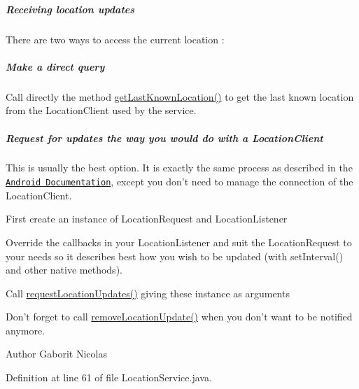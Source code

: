 \subparagraph*{Receiving location updates}

There are two ways to access the current location \-:

\subparagraph*{Make a direct query}

Call directly the method {\ttfamily \hyperlink{classcom_1_1qualoutdoor_1_1recorder_1_1location_1_1LocationService_a574473b9ffe0f5313210d299df2cefaa}{get\-Last\-Known\-Location()}} to get the last known location from the Location\-Client used by the service.

\subparagraph*{Request for updates the way you would do with a Location\-Client}

This is usually the best option. It is exactly the same process as described in the \href{http://developer.android.com/training/location/
receive-location-updates.html}{\tt Android Documentation}, except you don't need to manage the connection of the Location\-Client.


\begin{DoxyEnumerate}
\item First create an instance of Location\-Request and Location\-Listener
\item Override the callbacks in your Location\-Listener and suit the Location\-Request to your needs so it describes best how you wish to be updated (with {\ttfamily set\-Interval()} and other native methods).
\item Call {\ttfamily \hyperlink{classcom_1_1qualoutdoor_1_1recorder_1_1location_1_1LocationService_a1009c8b09c3497ee35ade5396f9ccb18}{request\-Location\-Updates()}} giving these instance as arguments
\item Don't forget to call {\ttfamily \hyperlink{classcom_1_1qualoutdoor_1_1recorder_1_1location_1_1LocationService_a3c6aad1fa5f2311357bd762861d9a7c9}{remove\-Location\-Update()}} when you don't want to be notified anymore.
\end{DoxyEnumerate}

\begin{DoxyAuthor}{Author}
Gaborit Nicolas 
\end{DoxyAuthor}


Definition at line 61 of file Location\-Service.\-java.



